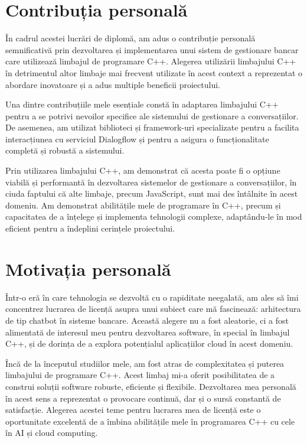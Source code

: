 \section{Contribuția personală}

În cadrul acestei lucrări de diplomă, am adus o contribuție personală semnificativă prin dezvoltarea și implementarea unui sistem de gestionare bancar care utilizează limbajul de programare C++. Alegerea utilizării limbajului C++ în detrimentul altor limbaje mai frecvent utilizate în acest context a reprezentat o abordare inovatoare și a adus multiple beneficii proiectului.

Una dintre contribuțiile mele esențiale constă în adaptarea limbajului C++ pentru a se potrivi nevoilor specifice ale sistemului de gestionare a conversațiilor. De asemenea, am utilizat biblioteci și framework-uri specializate pentru a facilita interacțiunea cu serviciul Dialogflow și pentru a asigura o funcționalitate completă și robustă a sistemului.

Prin utilizarea limbajului C++, am demonstrat că acesta poate fi o opțiune viabilă și performantă în dezvoltarea sistemelor de gestionare a conversațiilor, în ciuda faptului că alte limbaje, precum JavaScript, sunt mai des întâlnite în acest domeniu. Am demonstrat abilitățile mele de programare în C++, precum și capacitatea de a înțelege și implementa tehnologii complexe, adaptându-le în mod eficient pentru a îndeplini cerințele proiectului.

\section{Motivația personală}

Într-o eră în care tehnologia se dezvoltă cu o rapiditate neegalată, am ales să îmi concentrez lucrarea de licență asupra unui subiect care mă fascinează: arhitectura de tip chatbot în sisteme bancare. Această alegere nu a fost aleatorie, ci a fost alimentată de interesul meu pentru dezvoltarea software, în special în limbajul C++, și de dorința de a explora potențialul aplicațiilor cloud în acest domeniu.

Încă de la începutul studiilor mele, am fost atras de complexitatea și puterea limbajului de programare C++. Acest limbaj mi-a oferit posibilitatea de a construi soluții software robuste, eficiente și flexibile. Dezvoltarea mea personală în acest sens a reprezentat o provocare continuă, dar și o sursă constantă de satisfacție. Alegerea acestei teme pentru lucrarea mea de licență este o oportunitate excelentă de a îmbina abilitățile mele în programarea C++ cu cele în AI și cloud computing.

